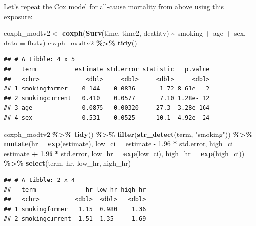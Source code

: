 \documentclass[
]{book}
\newenvironment{Shaded}{\begin{snugshade}}{\end{snugshade}}
\newcommand{\AttributeTok}[1]{\textcolor[rgb]{0.13,0.29,0.53}{#1}}
\newcommand{\FloatTok}[1]{\textcolor[rgb]{0.00,0.00,0.81}{#1}}
\newcommand{\FunctionTok}[1]{\textcolor[rgb]{0.13,0.29,0.53}{\textbf{#1}}}
\newcommand{\NormalTok}[1]{#1}
\newcommand{\OtherTok}[1]{\textcolor[rgb]{0.56,0.35,0.01}{#1}}
\newcommand{\SpecialCharTok}[1]{\textcolor[rgb]{0.81,0.36,0.00}{\textbf{#1}}}
\newcommand{\StringTok}[1]{\textcolor[rgb]{0.31,0.60,0.02}{#1}}
\begin{document}
Let's repeat the Cox model for all-cause mortality from above using this exposure:

\begin{Shaded}
\begin{Highlighting}[]
\NormalTok{coxph\_modtv2 }\OtherTok{\textless{}{-}} \FunctionTok{coxph}\NormalTok{(}\FunctionTok{Surv}\NormalTok{(time, time2, deathtv) }\SpecialCharTok{\textasciitilde{}}\NormalTok{ smoking }\SpecialCharTok{+}\NormalTok{ age }\SpecialCharTok{+}\NormalTok{ sex, }
                    \AttributeTok{data =}\NormalTok{ fhstv)}
\NormalTok{coxph\_modtv2 }\SpecialCharTok{\%\textgreater{}\%}
  \FunctionTok{tidy}\NormalTok{()}
\end{Highlighting}
\end{Shaded}

\begin{verbatim}
## # A tibble: 4 x 5
##   term           estimate std.error statistic   p.value
##   <chr>             <dbl>     <dbl>     <dbl>     <dbl>
## 1 smokingformer    0.144    0.0836       1.72 8.61e-  2
## 2 smokingcurrent   0.410    0.0577       7.10 1.28e- 12
## 3 age              0.0875   0.00320     27.3  3.28e-164
## 4 sex             -0.531    0.0525     -10.1  4.92e- 24
\end{verbatim}

\begin{Shaded}
\begin{Highlighting}[]
\NormalTok{coxph\_modtv2 }\SpecialCharTok{\%\textgreater{}\%} 
  \FunctionTok{tidy}\NormalTok{() }\SpecialCharTok{\%\textgreater{}\%} 
  \FunctionTok{filter}\NormalTok{(}\FunctionTok{str\_detect}\NormalTok{(term, }\StringTok{"smoking"}\NormalTok{)) }\SpecialCharTok{\%\textgreater{}\%} 
  \FunctionTok{mutate}\NormalTok{(}\AttributeTok{hr =} \FunctionTok{exp}\NormalTok{(estimate),}
         \AttributeTok{low\_ci =}\NormalTok{ estimate }\SpecialCharTok{{-}} \FloatTok{1.96} \SpecialCharTok{*}\NormalTok{ std.error, }
         \AttributeTok{high\_ci =}\NormalTok{ estimate }\SpecialCharTok{+} \FloatTok{1.96} \SpecialCharTok{*}\NormalTok{ std.error, }
         \AttributeTok{low\_hr =} \FunctionTok{exp}\NormalTok{(low\_ci), }
         \AttributeTok{high\_hr =} \FunctionTok{exp}\NormalTok{(high\_ci)) }\SpecialCharTok{\%\textgreater{}\%} 
  \FunctionTok{select}\NormalTok{(term, hr, low\_hr, high\_hr)}
\end{Highlighting}
\end{Shaded}

\begin{verbatim}
## # A tibble: 2 x 4
##   term              hr low_hr high_hr
##   <chr>          <dbl>  <dbl>   <dbl>
## 1 smokingformer   1.15  0.980    1.36
## 2 smokingcurrent  1.51  1.35     1.69
\end{verbatim}
\end{document}
